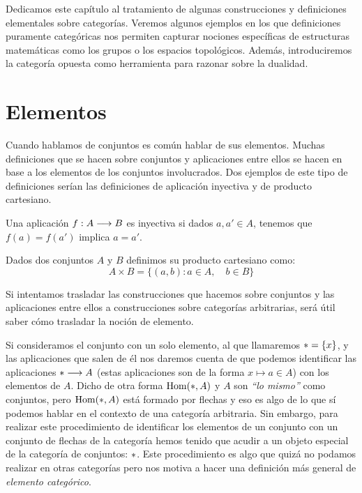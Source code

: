 Dedicamos este capítulo al tratamiento de
algunas construcciones y definiciones elementales
sobre categorías. Veremos algunos ejemplos en los que
definiciones puramente categóricas nos permiten capturar nociones
específicas de estructuras matemáticas como los grupos o los
espacios topológicos. Además, introduciremos la categoría opuesta
como herramienta para razonar sobre la dualidad.

\section{Elementos}
Cuando hablamos de conjuntos es común hablar de sus elementos. Muchas
definiciones que se hacen sobre conjuntos y aplicaciones entre
ellos se hacen en base a los elementos de los conjuntos involucrados.
Dos ejemplos de este tipo de definiciones serían las definiciones de
aplicación inyectiva y de producto cartesiano.

\begin{definition*}
Una aplicación $f : A\longrightarrow B$ es inyectiva si dados
$a, a' \in A$, tenemos que $f(a) = f(a')$ implica $a = a'$.
\end{definition*}

\begin{definition*}
Dados dos conjuntos $A$ y $B$ definimos su producto cartesiano
como:
$$A\times B = \{ (a, b) : a \in A, \quad b \in B \}$$
\end{definition*}

Si intentamos trasladar las construcciones que hacemos sobre
conjuntos y las aplicaciones entre ellos
a construcciones sobre categorías arbitrarias,
será útil saber cómo trasladar la noción de elemento.

Si consideramos el conjunto con un solo elemento, al que llamaremos
$* = \{ x \}$, y las aplicaciones que
salen de él nos daremos cuenta de que podemos
identificar las aplicaciones $*\longrightarrow A$
(estas aplicaciones son de la forma $x \mapsto a \in A$)
con los elementos
de $A$. Dicho de otra forma $\operatorname{Hom}(*, A)$ y $A$ son
\emph{``lo mismo''} como conjuntos,
pero $\operatorname{Hom}(*, A)$ está formado por flechas y eso es algo de lo que
sí podemos hablar en el contexto de una categoría
arbitraria. Sin embargo, para realizar
este procedimiento de identificar los elementos de un conjunto con
un conjunto de flechas de la categoría hemos tenido que acudir a un
objeto especial de la categoría de conjuntos: $*$. Este procedimiento
es algo que quizá no podamos realizar en otras categorías pero nos
motiva a hacer una definición más general de
\textit{elemento categórico}.

